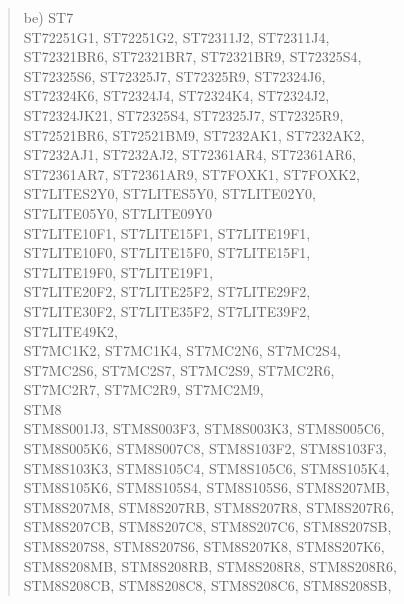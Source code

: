 \documentclass[12pt,twoside]{report}
\begin{document}
\begin{quote}
be) ST7 \\
    ST72251G1, ST72251G2, ST72311J2, ST72311J4, \\
    ST72321BR6, ST72321BR7, ST72321BR9, ST72325S4, \\
    ST72325S6, ST72325J7, ST72325R9, ST72324J6, \\
    ST72324K6, ST72324J4, ST72324K4, ST72324J2, \\
    ST72324JK21, ST72325S4, ST72325J7, ST72325R9, \\
    ST72521BR6, ST72521BM9, ST7232AK1, ST7232AK2, \\
    ST7232AJ1, ST7232AJ2, ST72361AR4, ST72361AR6, \\
    ST72361AR7, ST72361AR9, ST7FOXK1, ST7FOXK2, \\
    ST7LITES2Y0, ST7LITES5Y0, ST7LITE02Y0, \\
    ST7LITE05Y0, ST7LITE09Y0 \\
    ST7LITE10F1, ST7LITE15F1, ST7LITE19F1, \\
    ST7LITE10F0, ST7LITE15F0, ST7LITE15F1, \\
    ST7LITE19F0, ST7LITE19F1, \\
    ST7LITE20F2, ST7LITE25F2, ST7LITE29F2, \\
    ST7LITE30F2, ST7LITE35F2, ST7LITE39F2, \\
    ST7LITE49K2, \\
    ST7MC1K2, ST7MC1K4, ST7MC2N6, ST7MC2S4, \\
    ST7MC2S6, ST7MC2S7, ST7MC2S9, ST7MC2R6, \\
    ST7MC2R7, ST7MC2R9, ST7MC2M9, \\
    STM8 \\
    STM8S001J3, STM8S003F3, STM8S003K3, STM8S005C6,\\
    STM8S005K6, STM8S007C8, STM8S103F2, STM8S103F3,\\
    STM8S103K3, STM8S105C4, STM8S105C6, STM8S105K4,\\
    STM8S105K6, STM8S105S4, STM8S105S6, STM8S207MB,\\
    STM8S207M8, STM8S207RB, STM8S207R8, STM8S207R6,\\
    STM8S207CB, STM8S207C8, STM8S207C6, STM8S207SB,\\
    STM8S207S8, STM8S207S6, STM8S207K8, STM8S207K6,\\
    STM8S208MB, STM8S208RB, STM8S208R8, STM8S208R6,\\
    STM8S208CB, STM8S208C8, STM8S208C6, STM8S208SB,\\

\end{quote}
\end{document}

